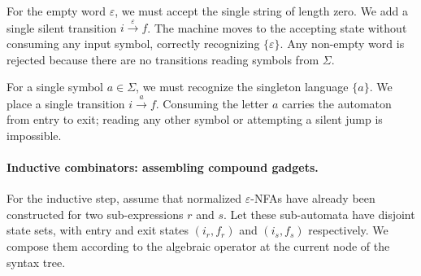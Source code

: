 For the empty word $\varepsilon$, we must accept the single string of length zero. We add a single silent transition $i \xrightarrow{\varepsilon} f$. The machine moves to the accepting state without consuming any input symbol, correctly recognizing $\{\varepsilon\}$. Any non-empty word is rejected because there are no transitions reading symbols from $\Sigma$.

For a single symbol $a \in \Sigma$, we must recognize the singleton language $\{a\}$. We place a single transition $i \xrightarrow{a} f$. Consuming the letter $a$ carries the automaton from entry to exit; reading any other symbol or attempting a silent jump is impossible.

\begin{center}
\begin{minipage}{\linewidth}
\centering
{}
\label{fig:thompson-base}
\end{minipage}
\end{center}

\paragraph{Inductive combinators: assembling compound gadgets.}
For the inductive step, assume that normalized $\varepsilon$-NFAs have already been constructed for two sub-expressions $r$ and $s$. Let these sub-automata have disjoint state sets, with entry and exit states $(i_r, f_r)$ and $(i_s, f_s)$ respectively. We compose them according to the algebraic operator at the current node of the syntax tree.

